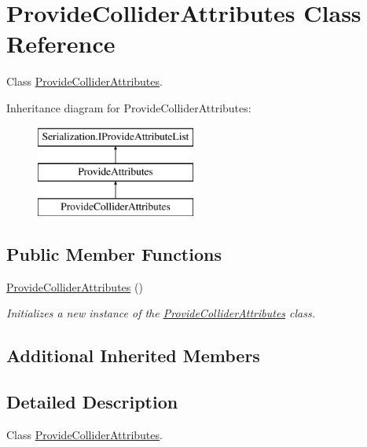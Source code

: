 \hypertarget{class_provide_collider_attributes}{}\section{Provide\+Collider\+Attributes Class Reference}
\label{class_provide_collider_attributes}


Class \hyperlink{class_provide_collider_attributes}{Provide\+Collider\+Attributes}.  


Inheritance diagram for Provide\+Collider\+Attributes\+:\begin{figure}[H]
\begin{center}
\leavevmode
\includegraphics[height=3.000000cm]{class_provide_collider_attributes}
\end{center}
\end{figure}
\subsection*{Public Member Functions}
\begin{DoxyCompactItemize}
\item 
\hyperlink{class_provide_collider_attributes_ae73c8b0cca5d8c1d42d7e7539eae6504}{Provide\+Collider\+Attributes} ()
\begin{DoxyCompactList}\small\item\em Initializes a new instance of the \hyperlink{class_provide_collider_attributes}{Provide\+Collider\+Attributes} class. \end{DoxyCompactList}\end{DoxyCompactItemize}
\subsection*{Additional Inherited Members}


\subsection{Detailed Description}
Class \hyperlink{class_provide_collider_attributes}{Provide\+Collider\+Attributes}. 



